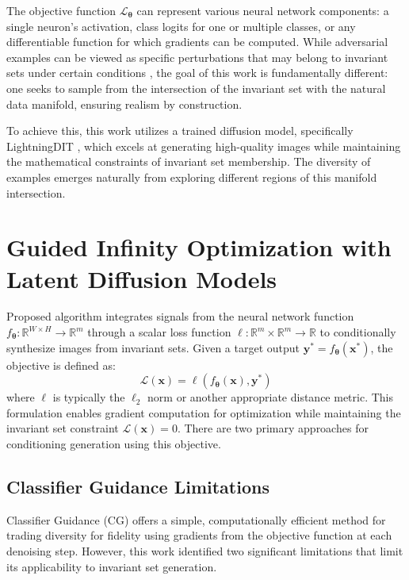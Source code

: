 The objective function $\mathcal{L}_{\boldsymbol{\theta}}$ can represent various neural network components: a single neuron's activation, class logits for one or multiple classes, or any differentiable function for which gradients can be computed. While adversarial examples can be viewed as specific perturbations that may belong to invariant sets under certain conditions \citep{szegedy2014intriguingpropertiesneuralnetworks}, the goal of this work is fundamentally different: one seeks to sample from the intersection of the invariant set with the natural data manifold, ensuring realism by construction.

To achieve this, this work utilizes a trained diffusion model, specifically LightningDIT \citep{yao2025vavae} \citep{yao2024fasterdit}, which excels at generating high-quality images while maintaining the mathematical constraints of invariant set membership. The diversity of examples emerges naturally from exploring different regions of this manifold intersection.


\section{Guided Infinity Optimization with Latent Diffusion Models}

Proposed algorithm integrates signals from the neural network function $f_{\boldsymbol{\theta}}:\mathbb{R}^{W \times H} \rightarrow \mathbb{R}^m$ through a scalar loss function $\ell: \mathbb{R}^m \times \mathbb{R}^m \rightarrow \mathbb{R}$ to conditionally synthesize images from invariant sets. Given a target output $\mathbf{y^*} = f_{\boldsymbol{\theta}}(\mathbf{x^*})$, the objective is defined as:
\begin{equation}
\mathcal{L}(\mathbf{x}) = \ell(f_{\boldsymbol{\theta}}(\mathbf{x}), \mathbf{y^*})
\end{equation}
where $\ell$ is typically the $\ell_2$ norm or another appropriate distance metric. This formulation enables gradient computation for optimization while maintaining the invariant set constraint $\mathcal{L}(\mathbf{x}) = 0$. There are two primary approaches for conditioning generation using this objective.

\subsection{Classifier Guidance Limitations}

Classifier Guidance (CG) \citep{dhariwal2021diffusionmodelsbeatgans} offers a simple, computationally efficient method for trading diversity for fidelity using gradients from the objective function at each denoising step. However, this work identified two significant limitations that limit its applicability to invariant set generation.

